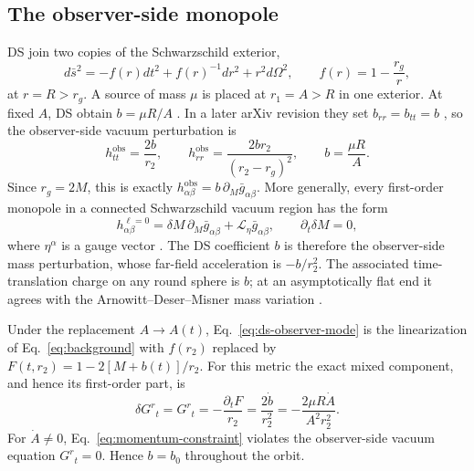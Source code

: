 \documentclass[aps,prd,10pt,onecolumn,nofootinbib,superscriptaddress,floatfix]{revtex4-2}
\begin{document}
\subsection{The observer-side monopole}

DS join two copies of the Schwarzschild exterior,
\begin{equation}
  d\bar s^2=-f(r)dt^2+f(r)^{-1}dr^2+r^2d\Omega^2,
  \qquad f(r)=1-\frac{r_g}{r},
  \label{eq:background}
\end{equation}
at $r=R>r_g$.  A source of mass $\mu$ is placed at $r_1=A>R$ in one
exterior.  At fixed $A$, DS obtain $b=\mu R/A$
\cite{DaiStojkovic2019Observing}.  In a later arXiv revision they set
$b_{rr}=b_{tt}=b$ \cite{DaiStojkovic2019ObservingV3}, so the observer-side
vacuum perturbation is
\begin{equation}
  h^{\mathrm{obs}}_{tt}=\frac{2b}{r_2},
  \qquad
  h^{\mathrm{obs}}_{rr}=\frac{2b r_2}{(r_2-r_g)^2},
  \qquad
  b=\frac{\mu R}{A}.
  \label{eq:ds-observer-mode}
\end{equation}
Since $r_g=2M$, this is exactly
$h^{\mathrm{obs}}_{\alpha\beta}=b\,\partial_M\bar g_{\alpha\beta}$.  More
generally, every first-order monopole in a connected Schwarzschild vacuum
region has the form
\begin{equation}
  h^{\ell=0}_{\alpha\beta}
  =\delta M\,\partial_M\bar g_{\alpha\beta}
   +\mathcal L_\eta\bar g_{\alpha\beta},
  \qquad \partial_t\delta M=0,
  \label{eq:l0-classification}
\end{equation}
where $\eta^\alpha$ is a gauge vector
\cite{MartelPoisson2005SchwarzschildPerturbations}.  The DS coefficient $b$ is
therefore the observer-side mass perturbation, whose far-field acceleration is
$-b/r_2^2$.  The associated time-translation charge on any round sphere is $b$;
at an asymptotically flat end it agrees with the Arnowitt--Deser--Misner mass
variation \cite{IyerWald1994NoetherCharge}.

Under the replacement $A\to A(t)$, Eq.~\eqref{eq:ds-observer-mode} is the
linearization of Eq.~\eqref{eq:background} with
$f(r_2)$ replaced by
$F(t,r_2)=1-2[M+b(t)]/r_2$.  For this metric the exact mixed component, and
hence its first-order part, is
\begin{equation}
  \delta G^{r}{}_{t}=G^{r}{}_{t}
  =-\frac{\partial_t F}{r_2}
  =\frac{2\dot b}{r_2^2}
  =-\frac{2\mu R\dot A}{A^2r_2^2}.
  \label{eq:momentum-constraint}
\end{equation}
For $\dot A\ne0$, Eq.~\eqref{eq:momentum-constraint} violates the observer-side
vacuum equation $G^{r}{}_{t}=0$.  Hence $b=b_0$ throughout the orbit.
\end{document}
